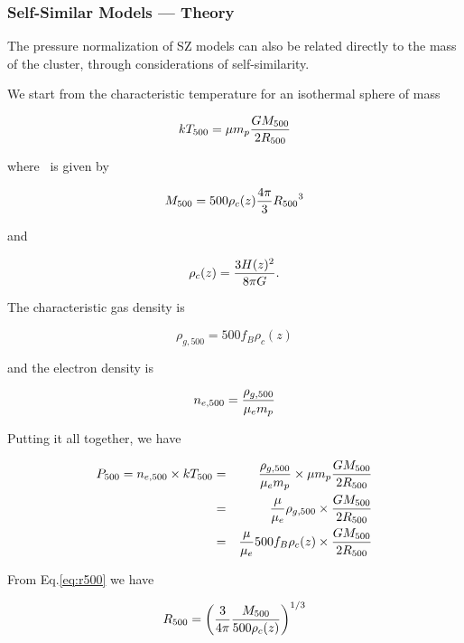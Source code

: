 \subsubsection{Self-Similar Models --- Theory}

The pressure normalization of SZ models can also be related directly
to the mass of the cluster, through considerations of self-similarity.

We start from the characteristic temperature for an isothermal sphere
of mass \

\begin{equation}
k\T500 = \mu m_p {{G \M500}\over{2\R500}}
\label{eq:t500}
\end{equation}

where \ is given by

\begin{equation}
\M500 = 500  \rho_c(z) {{4\pi}\over{3}}{\R500}^3
\label{eq:r500}
\end{equation}

and

\begin{equation}
\rho_c(z) = {{3 H(z)^2}\over{8\pi G}}.
\end{equation}

The characteristic gas density is

\begin{equation}
\rho_{g,500} = 500 f_B\rho_c(z)
\end{equation}

and the electron density is

\begin{equation}
n_{e,500} = {\rho_{g,500}\over{\mu_e m_p}}
\end{equation}

Putting it all together, we have

\begin{eqnarray}\nonumber
\P500 = n_{e,500} \times k\T500 &=& {\rho_{g,500}\over{\mu_e m_p}} \times \mu m_p {{G \M500}\over{2\R500}}\\\nonumber
&=& {{\mu}\over{\mu_e}}\rho_{g,500} \times {{G \M500}\over{2\R500}}\\
&=& {{\mu}\over{\mu_e}} 500 f_B\rho_c(z) \times {{G \M500}\over{2\R500}}
\end{eqnarray}

From Eq.\ref{eq:r500} we have 

\begin{equation}
\R500 = \left({3\over{4\pi}}{\M500\over{500 \rho_c(z)}}\right)^{1/3}
\end{equation}

